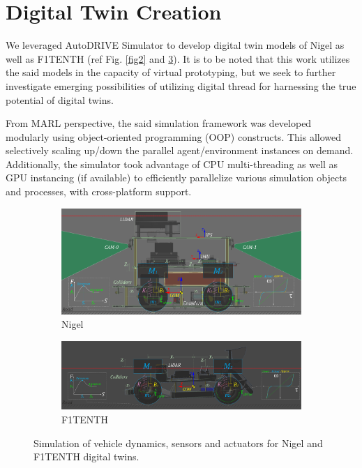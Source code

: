 \documentclass[letterpaper, 10 pt, conference]{ieeeconf}  %
\begin{document}

\section{Digital Twin Creation}
\label{Section: Digital Twin Creation}

We leveraged AutoDRIVE Simulator \cite{AutoDRIVESimulator2021, AutoDRIVESimulatorReport2020} to develop digital twin models of Nigel as well as F1TENTH (ref Fig. \ref{fig2} and \ref{fig3}). It is to be noted that this work utilizes the said models in the capacity of virtual prototyping, but we seek to further investigate emerging possibilities of utilizing digital thread for harnessing the true potential of digital twins.

From MARL perspective, the said simulation framework was developed modularly using object-oriented programming (OOP) constructs. This allowed selectively scaling up/down the parallel agent/environment instances on demand. Additionally, the simulator took advantage of CPU multi-threading as well as GPU instancing (if available) to efficiently parallelize various simulation objects and processes, with cross-platform support.

\begin{figure}[t]
     \centering
     \begin{subfigure}[b]{\linewidth}
         \centering
         \includegraphics[width=\linewidth]{Fig3a.png}
         \caption{Nigel}
         \label{fig3a}
     \end{subfigure}
     \hfill
     \begin{subfigure}[b]{\linewidth}
         \centering
         \includegraphics[width=\linewidth]{Fig3b.png}
         \caption{F1TENTH}
         \label{fig3b}
     \end{subfigure}
     \caption{Simulation of vehicle dynamics, sensors and actuators for Nigel and F1TENTH digital twins.}
    \label{fig3}
\end{figure}
\end{document}
